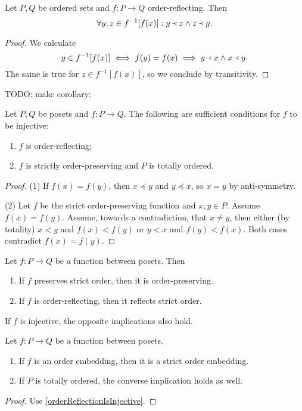 \begin{lemma}
Let $P,Q$ be ordered sets and $f: P\to Q$ order-reflecting. Then
\[ \forall y,z \in f^{-1}[f(x)]: y\Yleft z \land z\Yleft y. \]
\end{lemma}
\begin{proof}
We calculate
\[ y\in f^{-1}[f(x)] \iff f(y) = f(x) \implies y\Yleft x \land x\Yleft y. \]
The same is true for $z \in f^{-1}[f(x)]$, so we conclude by transitivity.
\end{proof}
TODO: make corollary:
\begin{lemma} \label{orderReflectionIsInjective} \label{strictOrderPreservationIsInjective}
Let $P,Q$ be posets and $f: P\to Q$. The following are sufficient conditions for $f$ to be injective:
\begin{enumerate}
\item $f$ is order-reflecting;
\item $f$ is strictly order-preserving and $P$ is totally ordered.
\end{enumerate}
\end{lemma}
\begin{proof}
(1) If $f(x) = f(y)$, then $x\preceq y$ and $y\preceq x$, so $x=y$ by anti-symmetry.

(2) Let $f$ be the strict order-preserving function and $x,y\in P$. Assume $f(x)=f(y)$. Assume, towards a contradiction, that $x\neq y$, then either (by totality) $x< y$ and $f(x) < f(y)$ or $y < x$ and $f(y)<f(x)$. Both cases contradict $f(x)=f(y)$.
\end{proof}

\begin{lemma}
Let $f:P\to Q$ be a function between posets. Then
\begin{enumerate}
\item If $f$ preserves strict order, then it is order-preserving.
\item If $f$ is order-reflecting, then it reflects strict order.
\end{enumerate}
If $f$ is injective, the opposite implications also hold.
\end{lemma}
\begin{corollary}
Let $f: P\to Q$ be a function between posets.
\begin{enumerate}
\item If $f$ is an order embedding, then it is a strict order embedding.
\item If $P$ is totally ordered, the converse implication holds as well.
\end{enumerate}
\end{corollary}
\begin{proof}
Use \ref{orderReflectionIsInjective}.
\end{proof}

